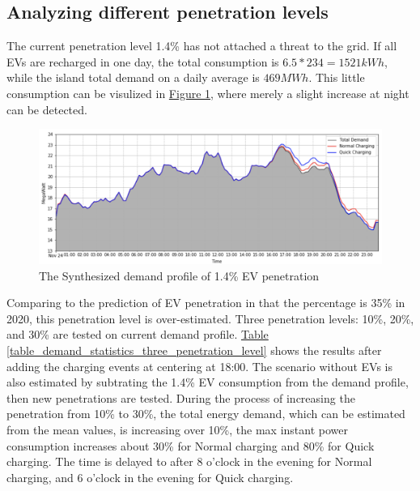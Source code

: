 \documentclass[12pt,a4paper]{report}
\begin{document}
                \subsection{Analyzing different penetration levels}
                The current penetration level 1.4\% has not attached a threat to the grid. If all EVs are recharged in one day, the total consumption is $6.5 * 234 = 1521 kW h$, while the island total demand on a daily average is $469 MW h$. This little consumption can be visulized in \hyperref[fig_1.4_syn]{Figure \ref*{fig_1.4_syn}}, where merely a slight increase at night can be detected.

                \begin{figure}[ht]
                    \centerline{\includegraphics[scale=1]{currentsyn}}
                    \caption{The Synthesized demand profile of 1.4\% EV penetration}
                    \label{fig_1.4_syn}
                \end{figure}

                Comparing to the prediction of EV penetration in \cite{paper:Vazquez2010} that the percentage is 35\% in 2020, this penetration level is over-estimated.
                Three penetration levels: 10\%, 20\%, and 30\% are tested on current demand profile. \hyperref[table_demand_statistics_three_penetration_level]{Table \ref*{table_demand_statistics_three_penetration_level}} shows the results after adding the charging events at centering at 18:00.
                The scenario without EVs is also estimated by subtrating the 1.4\% EV consumption from the demand profile, then new penetrations are tested. During the process of increasing the penetration from 10\% to 30\%, the total energy demand, which can be estimated from the mean values, is increasing over 10\%, the max instant power consumption increases about 30\% for Normal charging and 80\% for Quick charging. The time is delayed to after 8 o'clock in the evening for Normal charging, and 6 o'clock in the evening for Quick charging.
\end{document}
